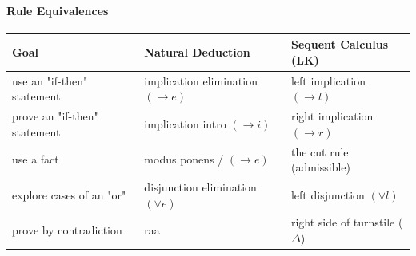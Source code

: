 \documentclass[a4paper, 11pt]{report}
\begin{document}
\paragraph{Rule Equivalences}
\begin{center}
\begin{tabular}{|l|l|l|}
\hline
\textbf{Goal} & \textbf{Natural Deduction} & \textbf{Sequent Calculus (LK)} \\
\hline
use an "if-then" statement & implication elimination $(\to e)$ & left implication $(\to l)$ \\
\hline
prove an "if-then" statement & implication intro $(\to i)$ & right implication $(\to r)$ \\
\hline
use a fact & modus ponens / $(\to e)$ & the cut rule (admissible) \\
\hline
explore cases of an "or" & disjunction elimination $(\vee e)$ & left disjunction $(\vee l)$ \\
\hline
prove by contradiction & raa & right side of turnstile ($\Delta$) \\
\hline
\end{tabular}
\end{center}
\end{document}
